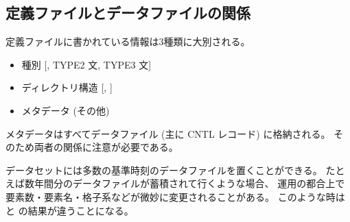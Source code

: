 \subsection{定義ファイルとデータファイルの関係}
\label{sec:dataflow}

定義ファイルに書かれている情報は3種類に大別される。
\begin{itemize}
\item 種別 [, TYPE2 文, TYPE3 文]
\item ディレクトリ構造 [, ]
\item メタデータ (その他)
\end{itemize}
メタデータはすべてデータファイル (主に CNTL レコード) に格納される。
そのため両者の関係に注意が必要である。

データセットには多数の基準時刻のデータファイルを置くことができる。
たとえば数年間分のデータファイルが蓄積されて行くような場合、
運用の都合上で要素数・要素名・格子系などが微妙に変更されることがある。
このような時は  と
 の結果が違うことになる。
